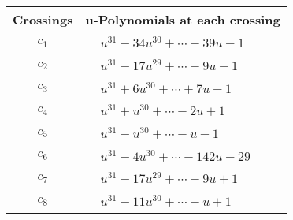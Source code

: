 \documentclass[1p]{elsarticle_modified}
\theoremstyle{definition}
\begin{document}
\begin{tabular}{m{50pt}|m{274pt}}
Crossings & \hspace{64pt}u-Polynomials at each crossing \\
\hline $$\begin{aligned}c_{1}\end{aligned}$$&$\begin{aligned}
&u^{31}-34 u^{30}+\cdots+39 u-1
\end{aligned}$\\
\hline $$\begin{aligned}c_{2}\end{aligned}$$&$\begin{aligned}
&u^{31}-17 u^{29}+\cdots+9 u-1
\end{aligned}$\\
\hline $$\begin{aligned}c_{3}\end{aligned}$$&$\begin{aligned}
&u^{31}+6 u^{30}+\cdots+7 u-1
\end{aligned}$\\
\hline $$\begin{aligned}c_{4}\end{aligned}$$&$\begin{aligned}
&u^{31}+u^{30}+\cdots-2 u+1
\end{aligned}$\\
\hline $$\begin{aligned}c_{5}\end{aligned}$$&$\begin{aligned}
&u^{31}- u^{30}+\cdots- u-1
\end{aligned}$\\
\hline $$\begin{aligned}c_{6}\end{aligned}$$&$\begin{aligned}
&u^{31}-4 u^{30}+\cdots-142 u-29
\end{aligned}$\\
\hline $$\begin{aligned}c_{7}\end{aligned}$$&$\begin{aligned}
&u^{31}-17 u^{29}+\cdots+9 u+1
\end{aligned}$\\
\hline $$\begin{aligned}c_{8}\end{aligned}$$&$\begin{aligned}
&u^{31}-11 u^{30}+\cdots+u+1
\end{aligned}$\\

\end{tabular}
\end{document}
